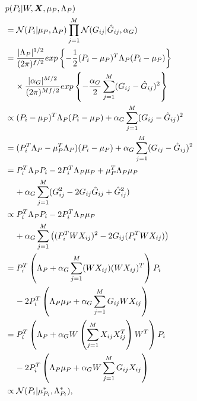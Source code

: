 \documentclass[10pt]{proc}
\begin{document}
\begin{align}
    &p(P_i | W, \bm{X}, \mu_P, \Lambda_P)  \\
    \nonumber
    &=  \mathcal{N}(P_i | \mu_P, \Lambda_P)
        \prod_{j=1}^M \mathcal{N}(G_{ij} | \hat{G}_{ij}, \alpha_G) \\
    \nonumber
    &= \frac{|\Lambda_P|^{1/2}}{(2\pi)^{f/2}}
        exp\left\{
            -\frac{1}{2} (P_i - \mu_P)^T \Lambda_P (P_i - \mu_P)
        \right\} \\
        &\hspace{4mm}\vspace{-2mm} \times
        \frac{|\alpha_G|^{M/2}}{(2\pi)^{Mf/2}}
        exp\left\{
            -\frac{\alpha_G}{2} \sum_{j=1}^M (G_{ij} - \hat{G}_{ij})^2
        \right\} \\
    &\propto
        (P_i - \mu_P)^T \Lambda_P (P_i - \mu_P) +
        \alpha_G \sum_{j=1}^M (G_{ij} - \hat{G}_{ij})^2 \\
    &=  (P_i^T\Lambda_P - \mu_P^T\Lambda_P) (P_i - \mu_P) +
        \alpha_G \sum_{j=1}^M (G_{ij} - \hat{G}_{ij})^2 \\
    \nonumber
    &=  P_i^T \Lambda_P P_i - 2 P_i^T \Lambda_P \mu_P + \mu_P^T \Lambda_P \mu_P \\
        &\hspace{4mm}\vspace{-2mm}
        + \alpha_G \sum_{j=1}^M
            (G_{ij}^2 - 2 G_{ij} \hat{G}_{ij} + \hat{G}_{ij}^2) \\
    \nonumber
    &\propto
        P_i^T \Lambda_P P_i - 2 P_i^T \Lambda_P \mu_P \\
        &\hspace{4mm}\vspace{-2mm}
        + \alpha_G \sum_{j=1}^M \left(
            (P_i^T W X_{ij})^2 - 2 G_{ij} (P_i^T W X_{ij})
        \right) \\
    \nonumber
    &=  P_i^T \left(
        \Lambda_P + \alpha_G \sum_{j=1}^M (W X_{ij})(W X_{ij})^T
        \right) P_i \\
        &\hspace{4mm}\vspace{-2mm}
        - 2 P_i^T \left(
            \Lambda_P \mu_P + \alpha_G \sum_{j=1}^M G_{ij} W X_{ij}
        \right) \\
    \nonumber
    &=  P_i^T \left(
            \Lambda_P + \alpha_G W \left(
                \sum_{j=1}^M X_{ij} X_{ij}^T
            \right) W^T
        \right) P_i \\
        &\hspace{4mm}\vspace{-2mm}
        - 2 P_i^T \left(
            \Lambda_P \mu_P + \alpha_G W \sum_{j=1}^M G_{ij} X_{ij}
        \right) \\
    &\propto
        \mathcal{N}(P_i | \mu_{P_i}^*, \Lambda_{P_i}^*),
\end{align}
\end{document}

